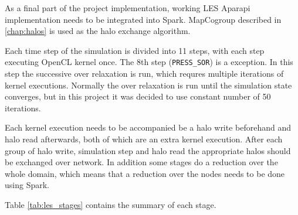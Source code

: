 \documentclass{l4proj}
\begin{document}
As a final part of the project implementation, working LES Aparapi implementation
needs to be integrated into Spark. MapCogroup described in \autoref{chap:halos}
is used as the halo exchange algorithm.

Each time step of the simulation is divided into 11 steps, with each step executing
OpenCL kernel once. The 8th step (\texttt{PRESS\_SOR}) is a exception. 
In this step the successive over relaxation is run, which requres multiple 
iterations of kernel executions. Normally the over relaxation is run until 
the simulation state converges, but in this project it was decided to use constant
number of 50 iterations.

Each kernel execution needs to be accompanied be a halo write beforehand 
and halo read afterwards, both of which are an extra kernel execution.
After each group of halo write, simulation step and halo read the appropriate halos
should be exchanged over network. In addition some stages do a reduction over 
the whole domain, which means that a reduction over the nodes needs to be done using Spark.

Table \ref{tab:les_stages} contains the summary of each stage.
\end{document}
